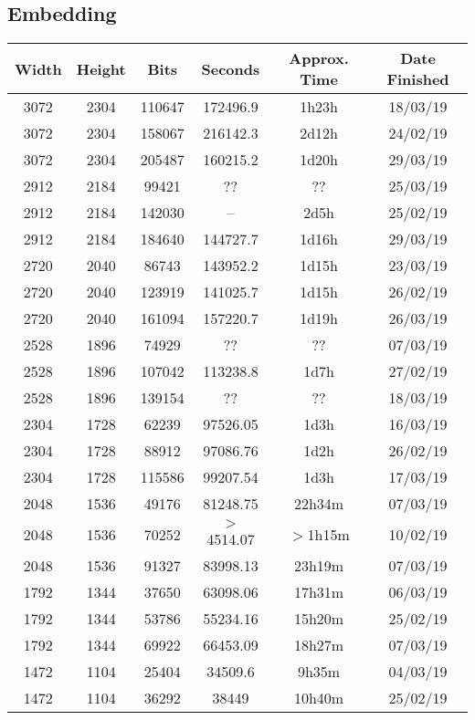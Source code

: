 \subsection{Embedding}
  \begin{center}
  \begin{tabular}{ c c c | c c c }
  Width & Height & Bits & Seconds & Approx. Time & Date Finished \\ \hline
  3072 & 2304 & 110647 & 172496.9 & 1h23h & 18/03/19 \\
  3072 & 2304 & 158067 & 216142.3 & 2d12h & 24/02/19 \\
  3072 & 2304 & 205487 & 160215.2 & 1d20h & 29/03/19 \\
  2912 & 2184 & 99421 & ?? & ?? & 25/03/19 \\ %
  2912 & 2184 & 142030 & -- & 2d5h & 25/02/19 \\
  2912 & 2184 & 184640 & 144727.7 & 1d16h & 29/03/19 \\
  2720 & 2040 & 86743 & 143952.2 & 1d15h & 23/03/19 \\
  2720 & 2040 & 123919 & 141025.7 & 1d15h & 26/02/19 \\
  2720 & 2040 & 161094 & 157220.7 & 1d19h & 26/03/19 \\
  2528 & 1896 & 74929 & ?? & ?? & 07/03/19 \\ %
  2528 & 1896 & 107042 & 113238.8 & 1d7h & 27/02/19 \\
  2528 & 1896 & 139154 & ?? & ?? & 18/03/19 \\ %
  2304 & 1728 & 62239 & 97526.05 & 1d3h & 16/03/19 \\
  2304 & 1728 & 88912 & 97086.76 & 1d2h & 26/02/19 \\
  2304 & 1728 & 115586 & 99207.54 & 1d3h & 17/03/19 \\
  2048 & 1536 & 49176 & 81248.75 & 22h34m & 07/03/19 \\
  2048 & 1536 & 70252 & $>$4514.07 & $>$1h15m & 10/02/19 \\
  2048 & 1536 & 91327 & 83998.13 & 23h19m & 07/03/19 \\
  1792 & 1344 & 37650 & 63098.06 & 17h31m & 06/03/19 \\
  1792 & 1344 & 53786 & 55234.16 & 15h20m & 25/02/19 \\
  1792 & 1344 & 69922 & 66453.09 & 18h27m & 07/03/19 \\
  1472 & 1104 & 25404 & 34509.6 & 9h35m & 04/03/19 \\
  1472 & 1104 & 36292 & 38449 & 10h40m & 25/02/19 \\

\end{tabular}
\end{center}
